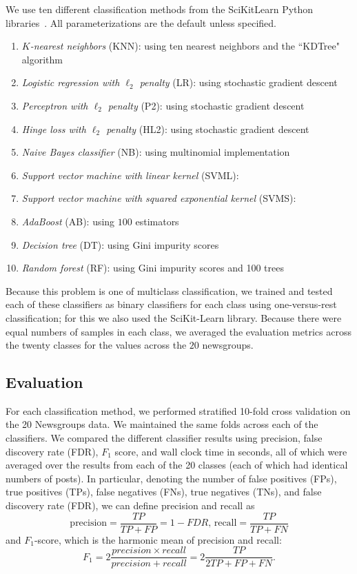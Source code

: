 \documentclass{article} %
\begin{document}
We use ten different classification methods from the SciKitLearn Python libraries~\cite{scikit-learn}. All parameterizations are the default unless specified.
\begin{enumerate}
\item \emph{$K$-nearest neighbors} (KNN): using ten nearest neighbors and the ``KDTree" algorithm
\item \emph{Logistic regression with $\ell_2$ penalty} (LR): using stochastic gradient descent 
\item \emph{Perceptron with $\ell_2$ penalty} (P2): using stochastic gradient descent
\item \emph{Hinge loss with $\ell_2$ penalty} (HL2): using stochastic gradient descent
\item \emph{Naive Bayes classifier} (NB): using multinomial implementation
\item \emph{Support vector machine with linear kernel} (SVML): 
\item \emph{Support vector machine with squared exponential kernel} (SVMS): 
\item \emph{AdaBoost} (AB): using $100$ estimators
\item \emph{Decision tree} (DT): using Gini impurity scores 
\item \emph{Random forest} (RF): using Gini impurity scores and 100 trees
\end{enumerate}

Because this problem is one of multiclass classification, we trained and tested each of these classifiers as binary classifiers for each class using one-versus-rest classification; for this we also used the SciKit-Learn library. Because there were equal numbers of samples in each class, we averaged the evaluation metrics across the twenty classes for the values across the $20$ newsgroups.

\subsection{Evaluation}

For each classification method, we performed stratified 10-fold cross validation on the 20 Newsgroups data. We maintained the same folds across each of the classifiers. We compared the different classifier results using precision, false discovery rate (FDR), $F_1$ score, and wall clock time in seconds, all of which were averaged over the results from each of the 20 classes (each of which had identical numbers of posts). In particular, denoting the number of false positives (FPs), true positives (TPs), false negatives (FNs), true negatives (TNs), and false discovery rate (FDR), we can define precision and recall as
\begin{equation*}
\mbox{precision} = \frac {TP}{TP+FP} = 1 - FDR \mbox{,  recall} = \frac {TP}{TP+FN}
\end{equation*}
and $F_1$-score, which is the harmonic mean of precision and recall:
\begin{equation*}
F_1 = 2 \frac {precision \times recall} {precision + recall} = 2 \frac{TP}{2TP+FP+FN}.
\end{equation*}
\newpage
\end{document}
